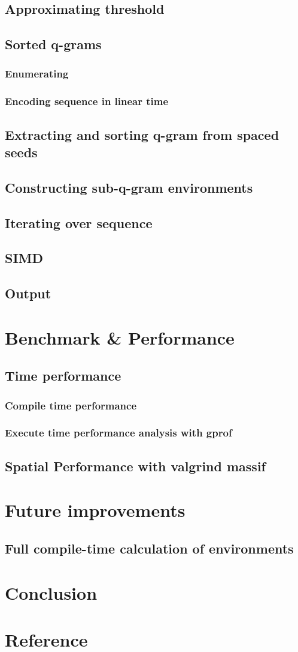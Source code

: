\documentclass[11pt,a4paper]{scrartcl}
\begin{document}
\subsection{Approximating threshold}
\subsection{Sorted q-grams}
\subsubsection{Enumerating}
\subsubsection{Encoding sequence in linear time}
\subsection{Extracting and sorting q-gram from spaced seeds}
\subsection{Constructing sub-q-gram environments}
\subsection{Iterating over sequence}
\subsection{SIMD}
\subsection{Output}
\newpage
\section{Benchmark \& Performance}
\subsection{Time performance}
\subsubsection{Compile time performance}
\subsubsection{Execute time performance analysis with gprof}
\subsection{Spatial Performance with valgrind massif}
\section{Future improvements}
\subsection{Full compile-time calculation of environments}


\section{Conclusion}
\section{Reference}
\end{document}

